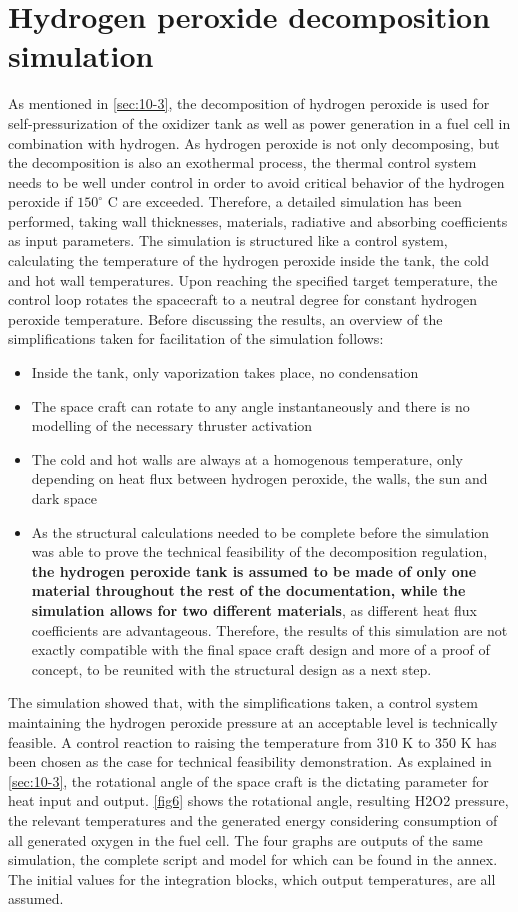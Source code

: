 \section{Hydrogen peroxide decomposition simulation}
\qquad As mentioned in \autoref{sec:10-3}, the decomposition of hydrogen peroxide is used for self-pressurization of the oxidizer tank as well as power generation in a fuel cell in combination with hydrogen. As hydrogen peroxide is not only decomposing, but the decomposition is also an exothermal process, the thermal control system needs to be well under control in order to avoid critical behavior of the hydrogen peroxide if $150^\circ$ C are exceeded. Therefore, a detailed simulation has been performed, taking wall thicknesses, materials, radiative and absorbing coefficients as input parameters. The simulation is structured like a control system, calculating the temperature of the hydrogen peroxide inside the tank, the cold and hot wall temperatures. Upon reaching the specified target temperature, the control loop rotates the spacecraft to a neutral degree for constant hydrogen peroxide temperature. Before discussing the results, an overview of the simplifications taken for facilitation of the simulation follows:
\begin{itemize}
	\itemsep0em 
	\item	Inside the tank, only vaporization takes place, no condensation
	\item	The space craft can rotate to any angle instantaneously and there is no modelling of the necessary thruster activation
	\item	The cold and hot walls are always at a homogenous temperature, only depending on heat flux between hydrogen peroxide, the walls, the sun and dark space
	\item	As the structural calculations needed to be complete before the simulation was able to prove the technical feasibility of the decomposition regulation, \textbf{the hydrogen peroxide tank is assumed to be made of only one material throughout the rest of the documentation, while the simulation allows for two different materials}, as different heat flux coefficients are advantageous. Therefore, the results of this simulation are not exactly compatible with the final space craft design and more of a proof of concept, to be reunited with the structural design as a next step.
\end{itemize}

The simulation showed that, with the simplifications taken, a control system maintaining the hydrogen peroxide pressure at an acceptable level is technically feasible. A control reaction to raising the temperature from $310$ K to $350$ K has been chosen as the case for technical feasibility demonstration. As explained in \autoref{sec:10-3}, the rotational angle of the space craft is the dictating parameter for heat input and output. \autoref{fig6} shows the rotational angle, resulting H2O2 pressure, the relevant temperatures and the generated energy considering consumption of all generated oxygen in the fuel cell. The four graphs are outputs of the same simulation, the complete script and model for which can be found in the annex. The initial values for the integration blocks, which output temperatures, are all assumed.

